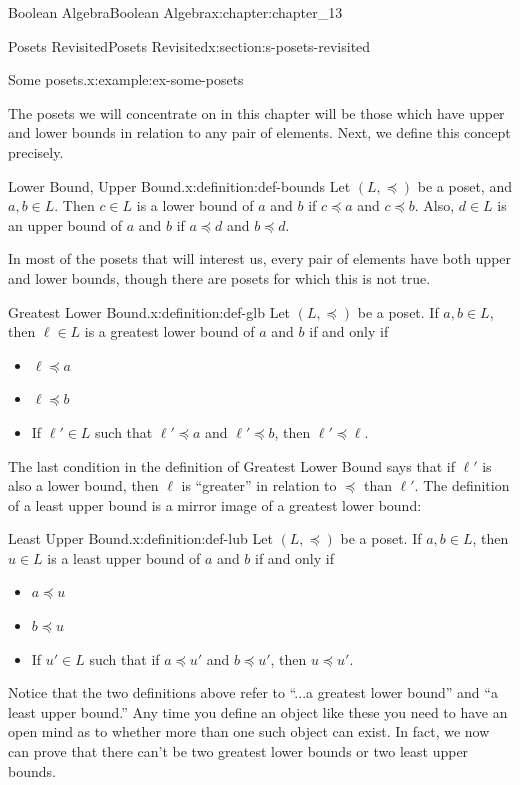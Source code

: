 \documentclass[oneside,10pt,]{book}
\numberwithin{equation}{section}
\begin{document}
\begin{chapterptx}{Boolean Algebra}{}{Boolean Algebra}{}{}{x:chapter:chapter_13}
\begin{sectionptx}{Posets Revisited}{}{Posets Revisited}{}{}{x:section:s-posets-revisited}
\begin{example}{Some posets.}{x:example:ex-some-posets}
%
\end{example}
The posets we will concentrate on in this chapter will be those which have upper and lower bounds in relation to any pair of elements. Next, we define this concept precisely.%
\begin{definition}{Lower Bound, Upper Bound.}{x:definition:def-bounds}%
%
%
Let \((L, \preceq)\) be a poset, and \(a, b \in  L\). Then \(c \in  L\) is a lower bound of \(a\) and \(b\) if \(c \preceq  a\) and \(c \preceq  b\). Also,  \(d \in  L\) is an upper bound of \(a\) and \(b\) if  \(a \preceq  d\) and \(b \preceq  d\).%
\end{definition}
In most of the posets that will interest us, every pair of elements have both upper and lower bounds, though there are posets for which this is not true.%
\begin{definition}{Greatest Lower Bound.}{x:definition:def-glb}%
%
Let \((L, \preceq)\) be a poset. If \(a, b \in  L\), then \(\ell \in  L\) is a greatest lower bound of \(a\) and \(b\)  if and only if%
\begin{itemize}[label=\textbullet]
\item{}\(\ell \preceq  a\)%
\item{}\(\ell \preceq  b\)%
\item{}If \(\ell' \in  L\) such that \(\ell' \preceq  a\) and \(\ell' \preceq  b\), then \(\ell' \preceq  \ell\).%
\end{itemize}
%
\end{definition}
The last condition in the definition of Greatest Lower Bound says that if  \(\ell'\)  is also a lower bound, then \(\ell\) is ``greater'' in relation to \(\preceq\) than \(\ell'\). The definition of a least upper bound is a mirror image of a greatest lower bound:%
\begin{definition}{Least Upper Bound.}{x:definition:def-lub}%
%
Let \((L, \preceq)\) be a poset. If \(a, b \in  L\), then \(u \in  L\) is a least upper bound of \(a\) and \(b\)  if and only if%
\begin{itemize}[label=\textbullet]
\item{}\(a \preceq  u\)%
\item{}\(b \preceq  u\)%
\item{}If \(u' \in  L\) such that if \(a \preceq  u'\) and \(b \preceq  u'\), then \(u \preceq  u'\).%
\end{itemize}
%
\end{definition}
Notice that the two definitions above refer to ``...a greatest lower bound''  and ``a least upper bound.''  Any time you define an object like these you need to have an open mind as to whether more than one such object can exist.  In fact, we now can prove that there can't be two greatest lower bounds or two least upper bounds.%

\end{sectionptx}
\end{chapterptx}
\end{document}
